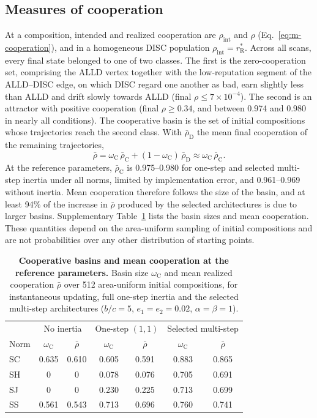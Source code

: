 \documentclass[10pt]{wlscirep}
\newcommand{\rR}{r_{\mathrm{R}}^{*}}
\theoremstyle{plain}
\theoremstyle{remark}
\begin{document}
\subsection{Measures of cooperation}

At a composition, intended and realized cooperation are $\rho_{\mathrm{int}}$ and $\rho$ (Eq.~\eqref{eq:m-cooperation}), and in a homogeneous DISC population $\rho_{\mathrm{int}}=\rR$. Across all scans, every final state belonged to one of two classes. The first is the zero-cooperation set, comprising the ALLD vertex together with the low-reputation segment of the ALLD--DISC edge, on which DISC regard one another as bad, earn slightly less than ALLD and drift slowly towards ALLD (final $\rho\leq7\times10^{-4}$). The second is an attractor with positive cooperation (final $\rho\geq0.34$, and between 0.974 and 0.980 in nearly all conditions). The cooperative basin is the set of initial compositions whose trajectories reach the second class. With $\bar\rho_{\mathrm D}$ the mean final cooperation of the remaining trajectories,
\begin{equation}
\bar\rho=\omega_{\mathrm C}\,\bar\rho_{\mathrm C}+(1-\omega_{\mathrm C})\,\bar\rho_{\mathrm D}\approx\omega_{\mathrm C}\,\bar\rho_{\mathrm C}.
\label{eq:s-decomposition}
\end{equation}
At the reference parameters, $\bar\rho_{\mathrm C}$ is 0.975--0.980 for one-step and selected multi-step inertia under all norms, limited by implementation error, and 0.961--0.969 without inertia. Mean cooperation therefore follows the size of the basin, and at least 94\% of the increase in $\bar\rho$ produced by the selected architectures is due to larger basins. Supplementary Table~\ref{tab:si-basins} lists the basin sizes and mean cooperation. These quantities depend on the area-uniform sampling of initial compositions and are not probabilities over any other distribution of starting points.

\begin{table}[!htbp]
\centering
\caption{\textbf{Cooperative basins and mean cooperation at the reference parameters.} Basin size $\omega_{\mathrm C}$ and mean realized cooperation $\bar\rho$ over 512 area-uniform initial compositions, for instantaneous updating, full one-step inertia and the selected multi-step architectures ($b/c=5$, $e_1=e_2=0.02$, $\alpha=\beta=1$).}
\label{tab:si-basins}
\small
\begin{tabular}{@{}lcccccc@{}}
\toprule
 & \multicolumn{2}{c}{No inertia} & \multicolumn{2}{c}{One-step $(1,1)$} & \multicolumn{2}{c}{Selected multi-step}\\
Norm & $\omega_{\mathrm C}$ & $\bar\rho$ & $\omega_{\mathrm C}$ & $\bar\rho$ & $\omega_{\mathrm C}$ & $\bar\rho$\\
\midrule
SC & 0.635 & 0.610 & 0.605 & 0.591 & 0.883 & 0.865\\
SH & 0 & 0 & 0.078 & 0.076 & 0.705 & 0.691\\
SJ & 0 & 0 & 0.230 & 0.225 & 0.713 & 0.699\\
SS & 0.561 & 0.543 & 0.713 & 0.696 & 0.760 & 0.741\\
\bottomrule
\end{tabular}
\end{table}
\end{document}
